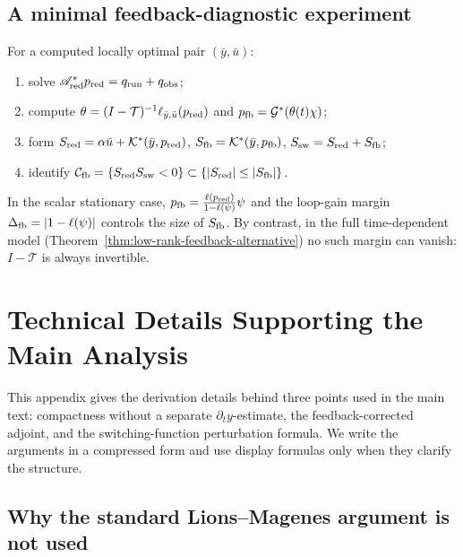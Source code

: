 \documentclass[pdflatex,sn-mathphys-num]{sn-jnl}
\theoremstyle{plain}
\theoremstyle{definition}
\theoremstyle{remark}
\begin{document}
\subsection{A minimal feedback-diagnostic experiment}
\label{subsec:minimal-feedback-diagnostic}
For a computed locally optimal pair $(\bar y,\bar u)$:
\begin{enumerate}[label=\textnormal{(\roman*)},leftmargin=*]
\item solve $\mathscr A_{\rm red}^*p_{\rm red}=q_{\rm run}+q_{\rm obs}$;
\item compute $\theta=(I-\mathcal T)^{-1}\ell_{\bar y,\bar u}(p_{\rm red})$ and
$p_{\rm fb}=\mathcal G^*(\theta(t)\chi)$;
\item form $S_{\rm red}=\alpha\bar u+\mathcal K^*(\bar y,p_{\rm red})$,
$S_{\rm fb}=\mathcal K^*(\bar y,p_{\rm fb})$, $S_{\rm sw}=S_{\rm red}+S_{\rm
fb}$;
\item identify $\mathcal C_{\rm fb}=\{S_{\rm red}S_{\rm sw}<0\}\subset
\{|S_{\rm red}|\le|S_{\rm fb}|\}$.
\end{enumerate}
In the scalar stationary case, $p_{\rm fb}=\frac{\ell(p_{\rm
red})}{1-\ell(\psi)}\psi$ and the loop-gain margin
$\Delta_{\rm fb}=|1-\ell(\psi)|$ controls the size of $S_{\rm fb}$. By
contrast, in the full time-dependent model
(Theorem~\ref{thm:low-rank-feedback-alternative}) no such margin can vanish:
$I-\mathcal T$ is always invertible.

\appendix
\section{Technical Details Supporting the Main Analysis}
\label{app:technical-details}

This appendix gives the derivation details behind three points used in the
main text: compactness without a separate \(\partial_t y\)-estimate, the
feedback-corrected adjoint, and the switching-function perturbation formula.
We write the arguments in a compressed form and use display formulas only when
they clarify the structure.

\subsection{Why the standard Lions--Magenes argument is not used}
\label{app:lions-magenes}
\end{document}
